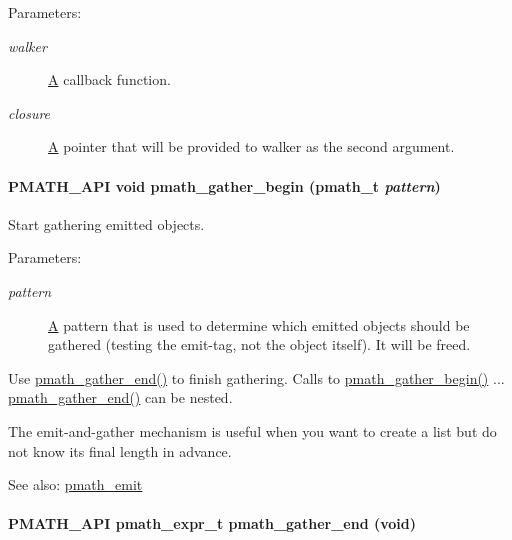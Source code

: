 \begin{Desc}
\item[Parameters:]
\begin{description}
\item[{\em walker}]\hyperlink{class_a}{A} callback function. \item[{\em closure}]\hyperlink{class_a}{A} pointer that will be provided to walker as the second argument. \end{description}
\end{Desc}
\hypertarget{group__helpers_g077f3730ca4275b87d9a35bce6013e45}{
\paragraph[{pmath\_\-gather\_\-begin}]{\setlength{\rightskip}{0pt plus 5cm}PMATH\_\-API void pmath\_\-gather\_\-begin ({\bf pmath\_\-t} {\em pattern})}\hfill}
\label{group__helpers_g077f3730ca4275b87d9a35bce6013e45}


Start gathering emitted objects. 

\begin{Desc}
\item[Parameters:]
\begin{description}
\item[{\em pattern}]\hyperlink{class_a}{A} pattern that is used to determine which emitted objects should be gathered (testing the emit-tag, not the object itself). It will be freed.\end{description}
\end{Desc}
Use \hyperlink{group__helpers_ga2f732b35703986263e3a15592b4a46e}{pmath\_\-gather\_\-end()} to finish gathering. Calls to \hyperlink{group__helpers_g077f3730ca4275b87d9a35bce6013e45}{pmath\_\-gather\_\-begin()} ... \hyperlink{group__helpers_ga2f732b35703986263e3a15592b4a46e}{pmath\_\-gather\_\-end()} can be nested.

The emit-and-gather mechanism is useful when you want to create a list but do not know its final length in advance.

\begin{Desc}
\item[See also:]\hyperlink{group__helpers_ga06135012f4d2a0faf696c0cd1111075}{pmath\_\-emit} \end{Desc}
\hypertarget{group__helpers_ga2f732b35703986263e3a15592b4a46e}{
\paragraph[{pmath\_\-gather\_\-end}]{\setlength{\rightskip}{0pt plus 5cm}PMATH\_\-API {\bf pmath\_\-expr\_\-t} pmath\_\-gather\_\-end (void)}\hfill}
\label{group__helpers_ga2f732b35703986263e3a15592b4a46e}



